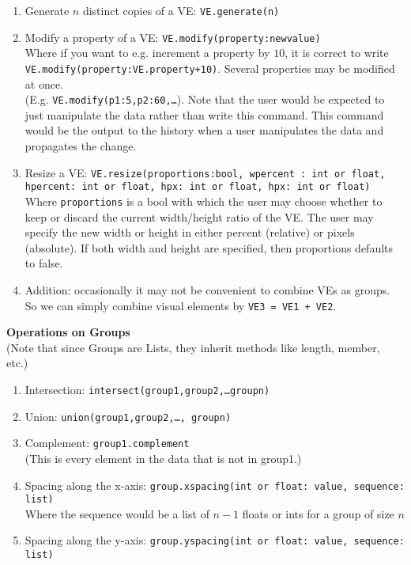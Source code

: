 \documentclass[12pt]{article}
\theoremstyle{remark}
\newcommand{\ttt}[1]{\texttt{#1}}
\begin{document}
\begin{enumerate}
\item Generate $n$ distinct copies of a VE: \ttt{VE.generate(n)}
\item Modify a property of a VE: \ttt{VE.modify(property:newvalue)}
\\
Where if you want to e.g. increment a property by $10$, it is correct to write\\ \ttt{VE.modify(property:VE.property+10)}. Several properties may be modified at once. \\
(E.g. \ttt{VE.modify(p1:5,p2:60,\ldots}). Note that the user would be expected to just manipulate the data rather than write this command. This command would be the output to the history when a user manipulates the data and propagates the change.
\item Resize a VE: \ttt{VE.resize(proportions:bool, wpercent : int or float, hpercent: int or float, hpx: int or float, hpx: int or float)}
\\
Where \ttt{proportions} is a bool with which the user may choose whether to keep or discard the current width/height ratio of the VE. The user may specify the new width or height in either percent (relative) or pixels (absolute). If both width and height are specified, then proportions defaults to false.
\item Addition: occasionally it may not be convenient to combine VEs as groups. So we can simply combine visual elements by \ttt{VE3 = VE1 + VE2}.
\end{enumerate}
\textbf{Operations on Groups}
\\
(Note that since Groups are Lists, they inherit methods like length, member, etc.)
\begin{enumerate}
\item Intersection: \ttt{intersect(group1,group2,\ldots groupn)}
\item Union: \ttt{union(group1,group2,\ldots, groupn)}
\item Complement: \ttt{group1.complement}
\\
(This is every element in the data that is not in group1.)
\item Spacing along the x-axis: \ttt{group.xspacing(int or float: value, sequence: list)}
\\ Where the sequence would be a list of $n-1$ floats or ints for a group of size $n$
\item Spacing along the y-axis: \ttt{group.yspacing(int or float: value, sequence: list)}
\end{enumerate}
\end{document}
